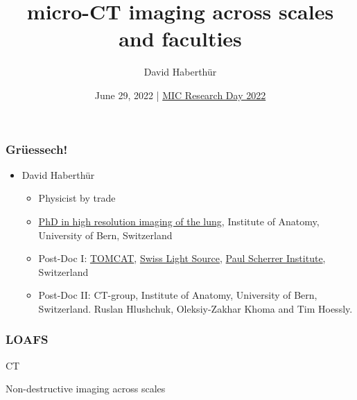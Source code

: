 \documentclass[aspectratio=169]{beamer}
\title{micro-CT imaging across scales and faculties}
\author{David Haberthür}
\date{June 29, 2022 | \href{https://www.mic.unibe.ch/events/mic_research_day_2022}{MIC Research Day 2022}}
\newcommand{\uct}{\textmu CT\xspace}%
\begin{document}
{%
	\begin{frame}%
		\maketitle
	\end{frame}%
}

\begin{frame}
	\frametitle{Grüessech!}
	\begin{itemize}
		\item David Haberthür
		\begin{itemize}
			\item Physicist by trade
			\item \href{https://boris.unibe.ch/2619/}{PhD in high resolution imaging of the lung}, Institute of Anatomy, University of Bern, Switzerland
			\item Post-Doc I: \href{https://www.psi.ch/sls/tomcat/}{TOMCAT}, \href{https://www.psi.ch/sls/}{Swiss Light Source}, \href{https://www.psi.ch/}{Paul Scherrer Institute}, Switzerland
			\item Post-Doc II: \uct-group, Institute of Anatomy, University of Bern, Switzerland.\newline
				Ruslan Hlushchuk, Oleksiy-Zakhar Khoma and Tim Hoessly.
		\end{itemize}
	\end{itemize}
\end{frame}

\begin{frame}
	\frametitle{LOAFS}
	\uct
	
	Non-destructive imaging across scales
\end{frame}
\end{document}
